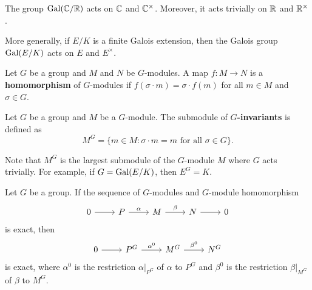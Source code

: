 \begin{example}
    The group $\operatorname{Gal}(\mathbb{C}/\mathbb{R})$ acts on $\mathbb{C}$ and $\mathbb{C}^\times$. Moreover, 
    it acts trivially on $\mathbb{R}$ and $\mathbb{R}^\times$. 
\end{example}

More generally, if $E/K$ is a finite Galois extension, then 
the Galois group $\operatorname{Gal}(E/K)$ acts on $E$ and $E^\times$. 

\begin{definition}
    Let $G$ be a group and $M$ and $N$ be $G$-modules. A map 
    $f\colon M\to N$ is a \textbf{homomorphism} of $G$-modules
    if $f(\sigma\cdot m)=\sigma\cdot f(m)$ for all $m\in M$ and $\sigma\in G$.
\end{definition}

\begin{definition}
    Let $G$ be a group and $M$ be a $G$-module.
    The submodule of \textbf{$G$-invariants} is defined as
    \[
    M^G=\{m\in M:\sigma\cdot m=m\text{ for all $\sigma\in G$}\}.
    \]
\end{definition}

Note that $M^G$ is the largest submodule of the $G$-module 
$M$ where $G$ acts trivially. For example, if 
$G=\operatorname{Gal}(E/K)$, then $E^G=K$. 

\begin{proposition}
\label{pro:H0}
    Let $G$ be a group. If the sequence
of $G$-modules and $G$-module homomorphism
\[
\begin{tikzcd}
    0 & P & M & N & 0
    \arrow[from=1-1, to=1-2]
    \arrow["\alpha", from=1-2, to=1-3]
    \arrow["\beta", from=1-3, to=1-4]
    \arrow[from=1-4, to=1-5]
    \end{tikzcd}\]
is exact, then 
\[
\begin{tikzcd}
                        0 & P^G & M^G & N^G 
                        \arrow[from=1-1, to=1-2]
                        \arrow["\alpha^0", from=1-2, to=1-3]
                        \arrow["\beta^0", from=1-3, to=1-4]
        \end{tikzcd}
        \]
is exact, where $\alpha^0$ is the restriction $\alpha|_{P^G}$ of $\alpha$ to $P^G$ and
$\beta^0$ is the restriction $\beta|_{M^G}$ of $\beta$ to $M^G$. 
\end{proposition}

